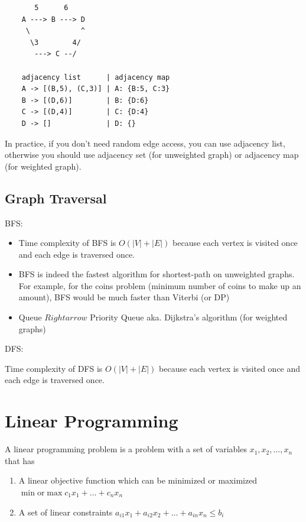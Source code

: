 \documentclass[12pt,a4paper]{article}
\begin{document}
\begin{verbatim}
       5      6
    A ---> B ---> D
     \            ^
      \3        4/
       ---> C --/

    adjacency list      | adjacency map
    A -> [(B,5), (C,3)] | A: {B:5, C:3}
    B -> [(D,6)]        | B: {D:6}
    C -> [(D,4)]        | C: {D:4}
    D -> []             | D: {}
\end{verbatim}

In practice, if you don't need random edge access, 
you can use adjacency list, otherwise you should use adjacency set (for unweighted graph) or adjacency map (for weighted graph).

\subsection*{Graph Traversal}

BFS:

\begin{itemize}
    \item Time complexity of BFS is \(O(|V| + |E|)\) because each vertex is visited once and each edge is traversed once.
    \item BFS is indeed the fastest algorithm for shortest-path on unweighted graphs. For example, for the coins problem (minimum number of coins to make up an amount), BFS would be much faster than Viterbi (or DP)
    \item Queue $Rightarrow$ Priority Queue aka. Dijkstra's algorithm (for weighted graphs)
\end{itemize}

DFS:

Time complexity of DFS is \(O(|V| + |E|)\) because each vertex is visited once and each edge is traversed once.





\section*{Linear Programming}

A linear programming problem is a problem with a set of variables \(x_1, x_2, \dots, x_n\) that has

\begin{enumerate}
    \item A linear objective function which can be minimized or maximized \\ 
            \(\min \text{or} \max c_1x_1+\dots+c_nx_n\)
    \item A set of linear constraints \(a_{i1}x_1 + a_{i2}x_2 + \dots + a_{in}x_n \leq b_i\) 
\end{enumerate}
\end{document}

